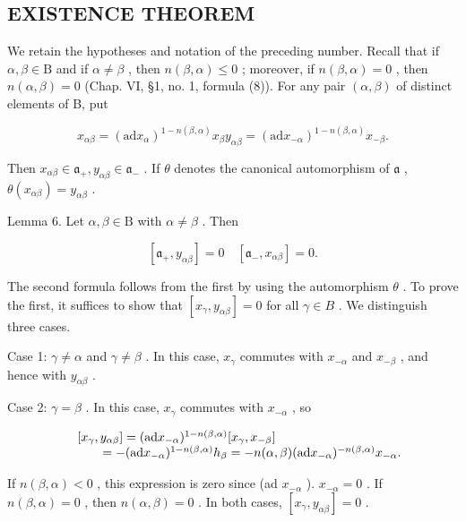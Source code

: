 \subsection{EXISTENCE THEOREM}

We retain the hypotheses and notation of the preceding number. Recall that if \(\alpha, \beta \in \mathrm{B}\) and if \(\alpha \neq \beta\) , then \(n(\beta, \alpha) \leq 0\) ; moreover, if \(n(\beta, \alpha) = 0\) , then \(n(\alpha, \beta) = 0\) (Chap. VI, §1, no. 1, formula (8)). For any pair \((\alpha, \beta)\) of distinct elements of B, put

\[
x _ {\alpha \beta} = (\mathrm{ad} x _ {\alpha}) ^ {1 - n (\beta , \alpha)} x _ {\beta} y _ {\alpha \beta} = (\mathrm{ad} x _ {- \alpha}) ^ {1 - n (\beta , \alpha)} x _ {- \beta}.
\]

Then \(x_{\alpha \beta} \in \mathfrak{a}_{+}, y_{\alpha \beta} \in \mathfrak{a}_{-}\) . If \(\theta\) denotes the canonical automorphism of \(\mathfrak{a}\) , \(\theta(x_{\alpha \beta}) = y_{\alpha \beta}\) .

Lemma 6. Let \(\alpha, \beta \in \mathrm{B}\) with \(\alpha \neq \beta\) . Then

\[
[ \mathfrak {a} _ {+}, y _ {\alpha \beta} ] = 0 \quad [ \mathfrak {a} _ {-}, x _ {\alpha \beta} ] = 0.
\]

The second formula follows from the first by using the automorphism \(\theta\) . To prove the first, it suffices to show that \([x_{\gamma}, y_{\alpha \beta}] = 0\) for all \(\gamma \in B\) . We distinguish three cases.

Case 1: \(\gamma \neq \alpha\) and \(\gamma \neq \beta\) . In this case, \(x_{\gamma}\) commutes with \(x_{-\alpha}\) and \(x_{-\beta}\) , and hence with \(y_{\alpha \beta}\) .

Case 2: \(\gamma = \beta\) . In this case, \(x_{\gamma}\) commutes with \(x_{-\alpha}\) , so

\[
\begin{array}{r l} & {[ x _ {\gamma}, y _ {\alpha \beta} ] = (\mathrm{ad} x _ {- \alpha}) ^ {1 - n (\beta , \alpha)} [ x _ {\gamma}, x _ {- \beta} ]} \\ & {\qquad = - (\mathrm{ad} x _ {- \alpha}) ^ {1 - n (\beta , \alpha)} h _ {\beta} = - n (\alpha , \beta) (\mathrm{ad} x _ {- \alpha}) ^ {- n (\beta , \alpha)} x _ {- \alpha}.} \end{array}
\]

If \(n(\beta, \alpha) < 0\) , this expression is zero since (ad \(x_{-\alpha}\) ). \(x_{-\alpha} = 0\) . If \(n(\beta, \alpha) = 0\) , then \(n(\alpha, \beta) = 0\) . In both cases, \([x_{\gamma}, y_{\alpha\beta}] = 0\) .

